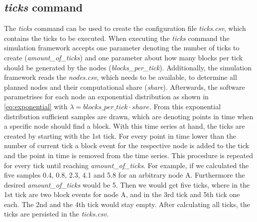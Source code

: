 \subsection{\textit{ticks} command} \label{chap:ticks_command}

The \textit{ticks} command can be used to create the configuration file \textit{ticks.csv}, which contains the ticks to be executed.
When executing the \textit{ticks} command the simulation framework accepts one parameter denoting the number of ticks to create (\textit{amount\_of\_ticks}) and one parameter about how many blocks per tick should be generated by the nodes (\textit{blocks\_per\_tick}).
Additionally, the simulation framework reads the \textit{nodes.csv}, which needs to be available, to determine all planned nodes and their computational share (\textit{share}).
Afterwards, the software parametrises for each node an exponential distribution as shown in \ref{eq:exponential} with $\lambda = blocks\_per\_tick \cdot share$.
From this exponential distribution sufficient samples are drawn, which are denoting points in time when a specific node should find a block.
With this time series at hand, the ticks are created by starting with the 1st tick.
For every point in time lower than the number of current tick a block event for the respective node is added to the tick and the point in time is removed from the time series.
This procedure is repeated for every tick until reaching \textit{amount\_of\_ticks}.
For example, if we calculated the five samples 0.4, 0.8, 2.3, 4.1 and 5.8 for an arbitrary node A.
Furthermore the desired \textit{amount\_of\_ticks} would be 5.
Then we would get five ticks, where in the 1st tick are two block events for node A, and in the 3rd tick  and 5th tick one each.
The 2nd and the 4th tick would stay empty. After calculating all ticks, the ticks are persisted in the \textit{ticks.csv}.

